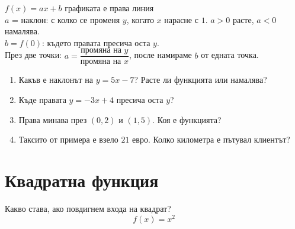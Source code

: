\documentclass[11pt,a4paper]{article}
\begin{document}
\begin{board}
$f(x)=ax+b$ \quad графиката е права линия\\[2pt]
$a$ = наклон: с колко се променя $y$, когато $x$ нарасне с $1$. \quad $a>0$ расте, $a<0$ намалява.\\[2pt]
$b=f(0)$: където правата пресича оста $y$.\\[2pt]
През две точки: $a=\dfrac{\text{промяна на } y}{\text{промяна на } x}$, после намираме $b$ от едната точка.
\end{board}

\begin{trybox}
\begin{enumerate}[label=\textbf{\arabic*.},start=7]
  \item Какъв е наклонът на $y=5x-7$? Расте ли функцията или намалява?
  \item Къде правата $y=-3x+4$ пресича оста $y$?
  \item Права минава през $(0,2)$ и $(1,5)$. Коя е функцията?
  \item Таксито от примера е взело $21$ евро. Колко километра е пътувал клиентът?
\end{enumerate}
\end{trybox}

\section{Квадратна функция}

Какво става, ако повдигнем входа на квадрат?
\[ f(x)=x^2 \]
\end{document}
